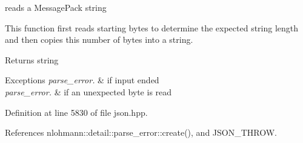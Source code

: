 reads a Message\+Pack string 

This function first reads starting bytes to determine the expected string length and then copies this number of bytes into a string.

\begin{DoxyReturn}{Returns}
string
\end{DoxyReturn}

\begin{DoxyExceptions}{Exceptions}
{\em parse\+\_\+error.} & if input ended \\
\hline
{\em parse\+\_\+error.} & if an unexpected byte is read \\
\hline
\end{DoxyExceptions}


Definition at line 5830 of file json.\+hpp.



References nlohmann\+::detail\+::parse\+\_\+error\+::create(), and J\+S\+O\+N\+\_\+\+T\+H\+R\+OW.


